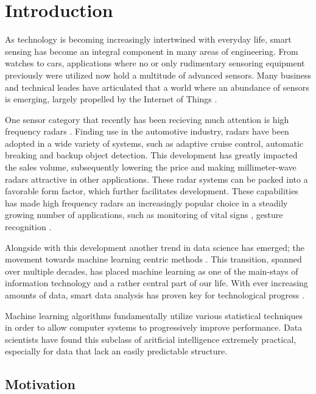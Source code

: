 \chapter{Introduction}

As technology is becoming increasingly intertwined with everyday life, smart sensing has become an integral component in many areas of engineering. From watches to cars, applications where no or only rudimentary sensoring equipment previously were utilized now hold a multitude of advanced sensors. Many business and technical leades have articulated that a world where an abundance of sensors is emerging, largely propelled by the Internet of Things \citep{bryzek_2013}. 

One sensor category that recently has been recieving much attention is high frequency radars \citep{frenzel_2018}. Finding use in the automotive industry, radars have been adopted in a wide variety of systems, such as adaptive cruise control, automatic breaking and backup object detection. This development has greatly impacted the sales volume, subsequently lowering the price and making millimeter-wave radars attractive in other applications. These radar systems can be packed into a favorable form factor, which further facilitates development. These capabilities has made high frequency radars an increasingly popular choice in a steadily growing number of applications, such as monitoring of vital signs \citep{kuo_lin_yu_lo_lyu_chou_chuang_2016}, gesture recognition \citep{lien_gillian_karagozler_amihood_schwesig_olson_raja_poupyrev_2016}.

Alongside with this development another trend in data science has emerged; the movement towards machine learning centric methods . This transition, spanned over multiple decades, has placed machine learning as one of the main-stays of information technology and a rather central part of our life. With ever increasing amounts of data, smart data analysis has proven key for technological progress \citep{a_smola_svn_vishwanathan_2010}.

Machine learning algorithms fundamentally utilize various statistical techniques in order to allow computer systems to progressively improve performance. Data scientists have found this subclass of aritficial intelligence extremely practical, especially for data that lack an easily predictable structure. 


\section{Motivation}

